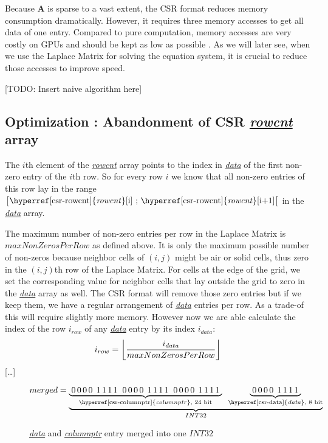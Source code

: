 \newpage
\par Because \textbf{A} is sparse to a vast extent, the CSR format reduces memory consumption dramatically. However, it requires three memory accesses to get all data of one entry. Compared to pure computation, memory accesses are very costly on GPUs and should be kept as low as possible \parencite{fang2018benchmarking}\parencite{fujii2013data}. As we will later see, when we use the Laplace Matrix for solving the equation system, it is crucial to reduce those accesses to improve speed.

[TODO: Insert naive algorithm here]


\subsection{Optimization : Abandonment of CSR \hyperref[csr-rowcnt]{\textit{rowcnt}} array}\label{optimization1}
The $i$th element of the \hyperref[csr-rowcnt]{\textit{rowcnt}} array points to the index in \hyperref[csr-data]{\textit{data}} of the first non-zero entry of the $i$th row. So for every row $i$ we know that all non-zero entries of this row lay in the range $\big[\text{\hyperref[csr-rowcnt]{\textit{rowcnt}}[i] ; \hyperref[csr-rowcnt]{\textit{rowcnt}}[i+1]}\big[$ in the \hyperref[csr-data]{\textit{data}} array. 
\par The maximum number of non-zero entries per row in the Laplace Matrix is $maxNonZerosPerRow$ as defined above. It is only the maximum possible number of non-zeros because neighbor cells of $(i,j)$ might be air or solid cells, thus zero in the $(i,j)$th row of the Laplace Matrix. For cells at the edge of the grid, we set the corresponding value for neighbor cells that lay outside the grid to zero in the \hyperref[csr-data]{\textit{data}} array as well. The CSR format will remove those zero entries but if we keep them, we have a regular arrangement of \hyperref[csr-data]{\textit{data}} entries per row. As a trade-of this will require slightly more memory. However now we are able calculate the index of the row $i_{row}$ of any \hyperref[csr-data]{\textit{data}} entry by its index $i_{data}$:
\begin{equation} \label{row-index-by-data-index}
	i_{row} = \floor*{\frac{i_{data}}{maxNonZerosPerRow}}
\end{equation}
[\dots]
\newpage

\begin{figure*}
\[
  merged = \underbrace{\underbrace{\;0\,0\,0\,0\:\:1\,1\,1\,1\;\;0\,0\,0\,0\:\:1\,1\,1\,1\;\;0\,0\,0\,0\:\:1\,1\,1\,1\;}_\text{\hyperref[csr-columnptr]{\textit{columnptr}}, 24 bit}\;\;\underbrace{\;0\,0\,0\,0\:\:1\,1\,1\,1\;}_\text{\hyperref[csr-data]{\textit{data}}, 8 bit}}_{INT32}
\]
\caption{\hyperref[csr-data]{\textit{data}} and \hyperref[csr-columnptr]{\textit{columnptr}} entry merged into one $INT32$}
\label{fig:data-columnptr-merge}
\end{figure*} 

